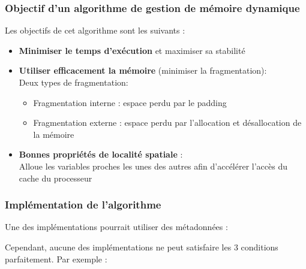 \documentclass{article}
\newcommand{\insertslide}[2]{
\begin{center}
    \fbox{\texttt{[image: \#1]}}
\end{center}
}
\begin{document}
        \subsubsection{Objectif d'un algorithme de gestion de mémoire dynamique}
            Les objectifs de cet algorithme sont les suivants :
            \begin{itemize}
                \item \textbf{Minimiser le temps d'exécution} et maximiser sa stabilité
                \item \textbf{Utiliser efficacement la mémoire} (minimiser la fragmentation):\\
                Deux types de fragmentation:
                \begin{itemize}
                    \item Fragmentation interne : espace perdu par le padding
                    \item Fragmentation externe : espace perdu par l'allocation et désallocation de la mémoire
                \end{itemize}
                \item \textbf{Bonnes propriétés de localité spatiale} :\\
                Alloue les variables proches les unes des autres afin d'accélérer l'accès du cache du processeur
            \end{itemize}
        
        \subsubsection{Implémentation de l'algorithme}
            Une des implémentations pourrait utiliser des métadonnées :
            \insertslide{Slides/CM3}{48}
\pagebreak
            Cependant, aucune des implémentations ne peut satisfaire les 3 conditions parfaitement.
            Par exemple :
            \insertslide{Slides/CM3}{55}
\end{document}
